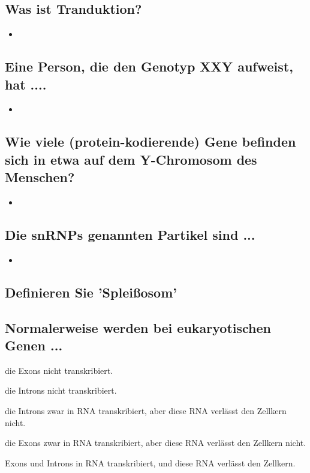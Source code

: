 \documentclass{article}
\begin{document}
\subsection*{Was ist Tranduktion?}
\begin{itemize}
    \item 
\end{itemize}

\subsection*{Eine Person, die den Genotyp XXY aufweist, hat ....}
\begin{itemize}
    \item 
\end{itemize}



\subsection*{Wie viele (protein-kodierende) Gene befinden sich in etwa auf dem Y-Chromosom des Menschen?}
\begin{itemize}
    \item 
\end{itemize}

\subsection*{Die snRNPs genannten Partikel sind ...}
\begin{itemize}
    \item 
\end{itemize}

\subsection*{Definieren Sie 'Spleißosom'}
\bigskip\bigskip \bigskip
\subsection*{Normalerweise werden bei eukaryotischen Genen ...}
\begin{todolist}%
\item die Exons nicht transkribiert.  
\item die Introns nicht transkribiert.  
\item die Introns zwar in RNA transkribiert, aber diese RNA verlässt den
Zellkern nicht.  
\item die Exons zwar in RNA transkribiert, aber diese RNA verlässt den
Zellkern nicht.  
\item Exons und Introns in RNA transkribiert, und diese RNA verlässt den
Zellkern.  
\end{todolist}
\end{document}
